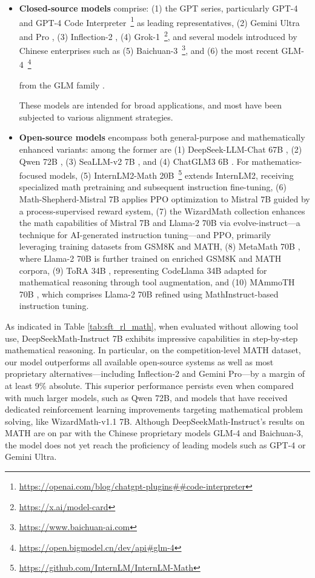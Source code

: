 \begin{itemize}[topsep=0pt]
\begin{itemize}[topsep=0pt]
    \item \textbf{Closed-source models} comprise: (1) the GPT series, particularly GPT-4 \citep{gpt4} and GPT-4 Code Interpreter~\footnote{\url{https://openai.com/blog/chatgpt-plugins\#\#code-interpreter}} as leading representatives, (2) Gemini Ultra and Pro \citep{gemini}, (3) Inflection-2 \citep{inflection-2}, (4) Grok-1~\footnote{\url{https://x.ai/model-card}},
    and several models introduced by Chinese enterprises such as (5) Baichuan-3~\footnote{\url{https://www.baichuan-ai.com}},
    and (6) the most recent GLM-4~\footnote{\url{https://open.bigmodel.cn/dev/api\#glm-4}}

    from the GLM family \citep{glm}.

These models are intended for broad applications, and most have been subjected to various alignment strategies.

\item \textbf{Open-source models} encompass both general-purpose and mathematically enhanced variants: among the former are (1) DeepSeek-LLM-Chat 67B \citep{deepseek-llm}, (2) Qwen 72B \citep{qwen}, (3) SeaLLM-v2 7B \citep{seallm}, and (4) ChatGLM3 6B \citep{chatglm3}. For mathematics-focused models, (5) InternLM2-Math 20B~\footnote{\url{https://github.com/InternLM/InternLM-Math}} extends InternLM2, receiving specialized math pretraining and subsequent instruction fine-tuning, (6) Math-Shepherd-Mistral 7B applies PPO optimization \citep{schulman2017proximal} to Mistral 7B \citep{mistral} guided by a process-supervised reward system, (7) the WizardMath collection \citep{wizardmath} enhances the math capabilities of Mistral 7B and Llama-2 70B \citep{llama2} via evolve-instruct—a technique for AI-generated instruction tuning—and PPO, primarily leveraging training datasets from GSM8K and MATH, (8) MetaMath 70B \citep{metamath}, where Llama-2 70B is further trained on enriched GSM8K and MATH corpora, (9) ToRA 34B \cite{tora}, representing CodeLlama 34B adapted for mathematical reasoning through tool augmentation, and (10) MAmmoTH 70B \citep{MathInstruct}, which comprises Llama-2 70B refined using MathInstruct-based instruction tuning.
\end{itemize}

As indicated in Table \ref{tab:sft_rl_math}, when evaluated without allowing tool use, DeepSeekMath-Instruct 7B exhibits impressive capabilities in step-by-step mathematical reasoning. In particular, on the competition-level MATH dataset, our model outperforms all available open-source systems as well as most proprietary alternatives—including Inflection-2 and Gemini Pro—by a margin of at least 9\% absolute. This superior performance persists even when compared with much larger models, such as Qwen 72B, and models that have received dedicated reinforcement learning improvements targeting mathematical problem solving, like WizardMath-v1.1 7B. Although DeepSeekMath-Instruct's results on MATH are on par with the Chinese proprietary models GLM-4 and Baichuan-3, the model does not yet reach the proficiency of leading models such as GPT-4 or Gemini Ultra.


\end{itemize}
